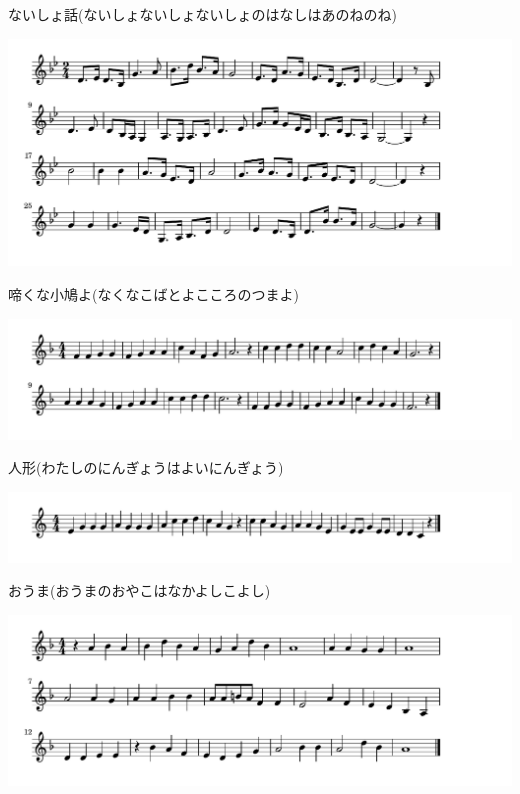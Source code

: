 \documentclass[a4paper]{ltjsarticle}
\begin{document}
\vspace{-10mm} \hspace{10mm}
ないしょ話(ないしょないしょないしょのはなしはあのねのね)

\includegraphics[clip]{nakunakobato_crop.pdf}

\vspace{-10mm} \hspace{10mm}
啼くな小鳩よ(なくなこばとよこころのつまよ)

\includegraphics[clip]{ningyou_crop.pdf}

\vspace{-10mm} \hspace{10mm}
人形(わたしのにんぎょうはよいにんぎょう)

\includegraphics[clip]{ouma_crop.pdf}

\vspace{-10mm} \hspace{10mm}
おうま(おうまのおやこはなかよしこよし)

\includegraphics[clip]{oedonihonbashi_crop.pdf}
\end{document}
